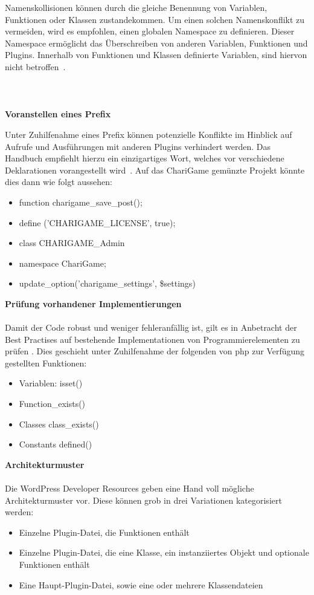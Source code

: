 Namenskollisionen können durch die gleiche Benennung von Variablen, Funktionen oder Klassen zustandekommen.
Um einen solchen Namenskonflikt zu vermeiden, wird es empfohlen, einen globalen Namespace zu definieren.
Dieser Namespace ermöglicht das Überschreiben von anderen Variablen, Funktionen und Plugins.
Innerhalb von Funktionen und Klassen definierte Variablen, sind hiervon nicht betroffen~\cite{wordpress2024Naming}.
\\
\\
\\\\
\textbf{Voranstellen eines Prefix}

Unter Zuhilfenahme eines Prefix können potenzielle Konflikte im Hinblick auf Aufrufe und Ausführungen mit anderen Plugins verhindert werden.
Das Handbuch empfiehlt hierzu ein einzigartiges Wort, welches vor verschiedene Deklarationen vorangestellt wird~\cite{wordpress2024ProceduralCodingMethod}.
Auf das ChariGame gemünzte Projekt könnte dies dann wie folgt aussehen:
\begin{itemize}
 \item function charigame\_save\_post();
 \item define ('CHARIGAME\_LICENSE', true);
 \item class CHARIGAME\_Admin{}
 \item namespace ChariGame;
 \item update\_option('charigame\_settings', \$settings)
\end{itemize}
\vspace{1em}
\textbf{Prüfung vorhandener Implementierungen}\\\\
Damit der Code robust und weniger fehleranfällig ist, gilt es in Anbetracht der Best Practises auf bestehende Implementationen von Programmierelementen zu prüfen \cite{wordpress2024CheckExisting}.
Dies geschieht unter Zuhilfenahme der folgenden von \gls{php} zur Verfügung gestellten Funktionen:
\begin{itemize}
 \item Variablen: isset()
 \item Function\_exists() %
 \item Classes class\_exists()
 \item Constants defined()
\end{itemize}
\vspace{1em}
\textbf{Architekturmuster}\\\\
Die WordPress Developer Resources geben eine Hand voll mögliche Architekturmuster vor.
Diese können grob in drei Variationen kategorisiert werden:
\begin{itemize}
 \item Einzelne Plugin-Datei, die Funktionen enthält
 \item Einzelne Plugin-Datei, die eine Klasse, ein instanziiertes Objekt und optionale Funktionen enthält
 \item Eine Haupt-Plugin-Datei, sowie eine oder mehrere Klassendateien
\end{itemize}

